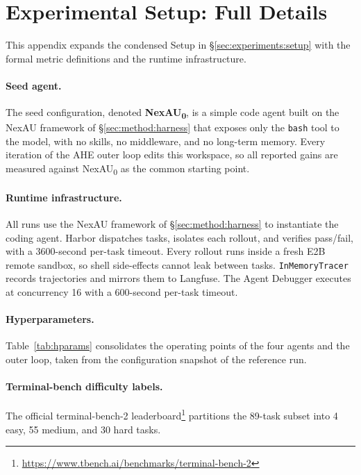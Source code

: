\section{Experimental Setup: Full Details}
\label{app:setup}

This appendix expands the condensed Setup in \S\ref{sec:experiments:setup} with the formal metric definitions and the runtime infrastructure.

\paragraph{Seed agent.}
The seed configuration, denoted \textbf{NexAU\textsubscript{0}}, is a simple code agent built on the NexAU framework of \S\ref{sec:method:harness} that exposes only the \texttt{bash} tool to the model, with no skills, no middleware, and no long-term memory. Every iteration of the AHE outer loop edits this workspace, so all reported gains are measured against NexAU\textsubscript{0} as the common starting point.

\paragraph{Runtime infrastructure.}
All runs use the NexAU framework of \S\ref{sec:method:harness} to instantiate the coding agent. Harbor dispatches tasks, isolates each rollout, and verifies pass/fail, with a 3600-second per-task timeout. Every rollout runs inside a fresh E2B remote sandbox, so shell side-effects cannot leak between tasks. \texttt{InMemoryTracer} records trajectories and mirrors them to Langfuse. The Agent Debugger executes at concurrency 16 with a 600-second per-task timeout.

\paragraph{Hyperparameters.}
Table~\ref{tab:hparams} consolidates the operating points of the four agents and the outer loop, taken from the configuration snapshot of the reference run.



\paragraph{Terminal-bench difficulty labels.}
The official terminal-bench-2 leaderboard\footnote{\url{https://www.tbench.ai/benchmarks/terminal-bench-2}} partitions the 89-task subset into 4 easy, 55 medium, and 30 hard tasks.

